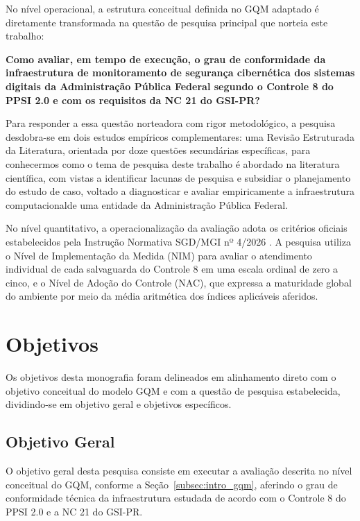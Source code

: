 No nível operacional, a estrutura conceitual definida no GQM adaptado é diretamente transformada na questão de pesquisa principal que norteia este trabalho:

\textbf{Como avaliar, em tempo de execução, o grau de conformidade da infraestrutura de monitoramento de segurança cibernética dos sistemas digitais da Administração Pública Federal segundo o Controle 8 do PPSI 2.0 e com os requisitos da NC 21 do GSI-PR?}

Para responder a essa questão norteadora com rigor metodológico, a pesquisa desdobra-se em dois estudos empíricos complementares: uma Revisão Estruturada da Literatura, orientada por doze questões secundárias específicas, para conhecermos como o tema de pesquisa deste trabalho é abordado na literatura científica, com vistas a identificar lacunas de pesquisa e subsidiar o planejamento do estudo de caso, voltado a diagnosticar e avaliar empiricamente a infraestrutura computacionalde uma entidade da Administração Pública Federal.

No nível quantitativo, a operacionalização da avaliação adota os critérios oficiais estabelecidos pela Instrução Normativa SGD/MGI nº 4/2026 \cite{in4_2026}. A pesquisa utiliza o Nível de Implementação da Medida (NIM) para avaliar o atendimento individual de cada salvaguarda do Controle 8 em uma escala ordinal de zero a cinco, e o Nível de Adoção do Controle (NAC), que expressa a maturidade global do ambiente por meio da média aritmética dos índices aplicáveis aferidos.

\section{Objetivos}
\label{sec:intro_objetivos}

Os objetivos desta monografia foram delineados em alinhamento direto com o objetivo conceitual do modelo GQM e com a questão de pesquisa estabelecida, dividindo-se em objetivo geral e objetivos específicos.

\subsection{Objetivo Geral}
\label{subsec:intro_objetivo_geral}
\label{subsec:intro_obj_geral}

O objetivo geral desta pesquisa consiste em executar a avaliação  descrita no nível conceitual do GQM, conforme a Seção~\ref{subsec:intro_gqm}, aferindo o grau de conformidade técnica da infraestrutura estudada de acordo com o Controle 8 do PPSI 2.0 e a NC 21 do GSI-PR.


